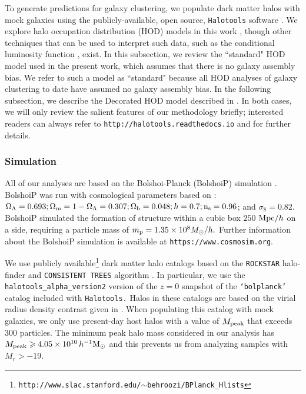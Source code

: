 \documentclass[usenatbib,usegraphicx,letterpaper]{mn2e}
\begin{document}
To generate predictions for galaxy clustering, 
we populate dark matter halos with mock galaxies using the publicly-available, 
open source, {\tt Halotools} software \citep{halotools}.
We explore halo occupation distribution (HOD) models in this work
\citep[e.g.][]{seljak00,ma_fry00,scoccimarro01a,berlind02}, though other
techniques that can be used to interpret such data, such as the conditional luminosity function
\citep[CLF, e.g.,][]{yang03,vdBosch13}, exist. In this subsection, we review the ``standard" HOD
model used in the present work, which assumes that there is no galaxy assembly bias. We refer to
such a model as ``standard" because all HOD analyses of galaxy clustering to date have assumed no
galaxy assembly bias. In the following subsection, we describe
the Decorated HOD model described in \citet{hearin_etal16}. In both cases, we will only
review the salient features of our methodology briefly;
interested readers can always refer to {\tt http://halotools.readthedocs.io} and
\citet{hearin_etal16} for further details.


\subsubsection{Simulation}

All of our analyses are based on the Bolshoi-Planck (BolshoiP) simulation \citep{riebe_etal11}.
BolshoiP was run with cosmological parameters based on \citet{planck13}:
$\Omega_{\Lambda} = 0.693; \Omega_{\rm m} = 1 - \Omega_{\Lambda} = 0.307; \Omega_{\rm b} = 0.048;
h = 0.7; {\rm n_s}=0.96$; and $\sigma_8 = 0.82$. BolshoiP simulated the formation of structure within a cubic 
box $250$ ${\rm Mpc}/h$ on a side, requiring a particle mass of $m_{\rm p} = 1.35\times10^{8}M_{\odot}/h.$
Further information about the BolshoiP simulation is available at {\tt https://www.cosmosim.org}.

We use publicly available\footnote{\tt http://www.slac.stanford.edu/$\sim$behroozi/BPlanck\_Hlists} dark matter
halo catalogs based on the {\tt ROCKSTAR} halo-finder \citep{behroozi_rockstar11} 
and {\tt CONSISTENT TREES} algorithm \citep{behroozi_trees13}. In particular, we use the {\tt halotools\_alpha\_version2} 
version of the $z=0$ snapshot
of the {\tt `bolplanck'} catalog included with {\tt Halotools.} Halos in these catalogs are based on the virial radius
density contrast given in \citet{bryan_norman98}. When populating this catalog with mock galaxies, we only use
present-day host halos with a value of $M_{\rm peak}$ that exceeds $300$ particles. The minimum 
peak halo mass considered in our analysis has $M_{\rm peak} \ge 4.05 \times 10^{10}\, h^{-1}\mathrm{M}_{\odot}$ 
and this prevents us from analyzing samples with $M_r > -19$. 
\end{document}
